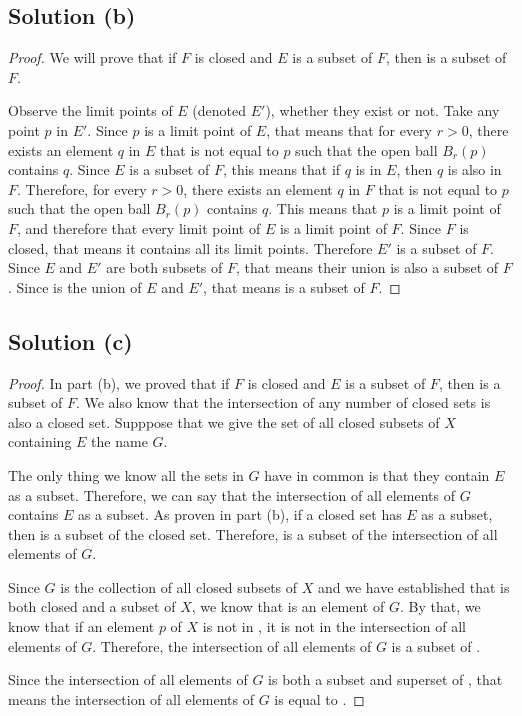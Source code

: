 \documentclass[11pt]{article}
\begin{document}
    \subsection{Solution (b)}
        \begin{proof}
            We will prove that if $F$ is closed and $E$ is a subset of $F$, then  is a subset of $F$.

            Observe the limit points of $E$ (denoted $E'$), whether they exist or not.
            Take any point $p$ in $E'$.
            Since $p$ is a limit point of $E$, that means that for every $r > 0$, there exists an element $q$ in $E$ that is not equal to $p$ such that the open ball $B_r(p)$ contains $q$.
            Since $E$ is a subset of $F$, this means that if $q$ is in $E$, then $q$ is also in $F$.
            Therefore, for every $r > 0$, there exists an element $q$ in $F$ that is not equal to $p$ such that the open ball $B_r(p)$ contains $q$.
            This means that $p$ is a limit point of $F$, and therefore that every limit point of $E$ is a limit point of $F$.
            Since $F$ is closed, that means it contains all its limit points.
            Therefore $E'$ is a subset of $F$.
            Since $E$ and $E'$ are both subsets of $F$, that means their union is also a subset of $F$.
            Since  is the union of $E$ and $E'$, that means  is a subset of $F$.
        \end{proof}

    \subsection{Solution (c)}
        \begin{proof}
            In part (b), we proved that if $F$ is closed and $E$ is a subset of $F$, then  is a subset of $F$.
            We also know that the intersection of any number of closed sets is also a closed set.
            Supppose that we give the set of all closed subsets of $X$ containing $E$ the name $G$.

            The only thing we know all the sets in $G$ have in common is that they contain $E$ as a subset. 
            Therefore, we can say that the intersection of all elements of $G$ contains $E$ as a subset.
            As proven in part (b), if a closed set has $E$ as a subset, then  is a subset of the closed set.
            Therefore,  is a subset of the intersection of all elements of $G$.

            Since $G$ is the collection of all closed subsets of $X$ and we have established that  is both closed and a subset of $X$, we know that  is an element of $G$.
            By that, we know that if an element $p$ of $X$ is not in , it is not in the intersection of all elements of $G$.
            Therefore, the intersection of all elements of $G$ is a subset of .

            Since the intersection of all elements of $G$ is both a subset and superset of , that means the intersection of all elements of $G$ is equal to .
        \end{proof}
\end{document}
